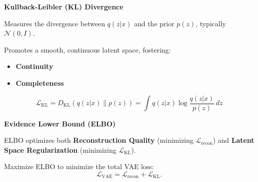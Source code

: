 \documentclass{beamer}
\begin{document}
\begin{frame}{\textbf{Kullback-Leibler (KL) Divergence}}
    \begin{tcolorbox}[colback=blue!20!white, colframe=blue!70!black]
        Measures the divergence between \( q(z|x) \) and the prior \( p(z) \), typically \( \mathcal{N}(0, I) \).
    \end{tcolorbox}

    \pause

    \begin{tcolorbox}[colback=teal!10!white, colframe=teal!70!black, title=\textbf{Regularization Purpose}]
        Promotes a smooth, continuous latent space, fostering:
        \begin{itemize}
            \item \textbf{Continuity}
            \item \textbf{Completeness}
        \end{itemize}
    \end{tcolorbox}

    \pause
    
    \begin{tcolorbox}[colback=red!10!white, colframe=red!70!black, title=\textbf{KL Divergence Formula}]
        \[
        \mathcal{L}_{\text{KL}} = D_{\text{KL}}(q(z|x) \| p(z)) = \int q(z|x) \log \frac{q(z|x)}{p(z)} \, dz
        \]
    \end{tcolorbox}
\end{frame}

\begin{frame}{\textbf{Evidence Lower Bound (ELBO)}}
    \begin{tcolorbox}[colback=red!10!white, colframe=red!75!black, title=\textbf{ELBO: Overview}]
        ELBO optimizes both \textbf{Reconstruction Quality} (minimizing \( \mathcal{L}_{\text{recon}} \)) and \textbf{Latent Space Regularization} (minimizing \( \mathcal{L}_{\text{KL}} \)).
    \end{tcolorbox}
    
    \vspace{1em}

    \begin{tcolorbox}[colback=teal!10!white, colframe=teal!75!black, title=\textbf{Goal}]
        Maximize ELBO to minimize the total VAE loss: 
        \[
        \mathcal{L}_{\text{VAE}} = \mathcal{L}_{\text{recon}} + \mathcal{L}_{\text{KL}}.
        \]
    \end{tcolorbox}
\end{frame}
\end{document}
